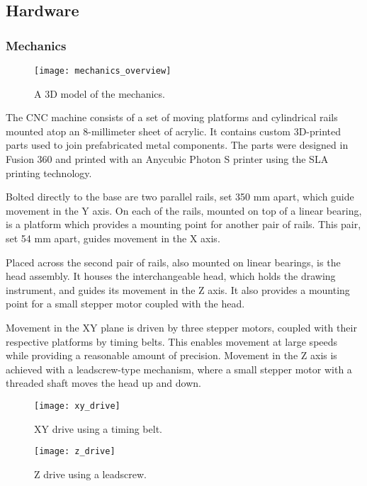 \clearpage
\subsection{Hardware}

\subsubsection{Mechanics}

\begin{figure}[ht]
    \begin{center}
        \texttt{[image: mechanics\_overview]}
        \caption{A 3D model of the mechanics.}
    \end{center}
\end{figure}

The CNC machine consists of a set of moving platforms and cylindrical rails
mounted atop an 8-millimeter sheet of acrylic. It contains custom 3D-printed
parts used to join prefabricated metal components. The parts were designed in
Fusion 360 and printed with an Anycubic Photon S printer using the SLA
printing technology.

Bolted directly to the base are two parallel rails, set 350 mm apart, which
guide movement in the Y axis. On each of the rails, mounted on top of a linear
bearing, is a platform which provides a mounting point for another pair of
rails. This pair, set 54 mm apart, guides movement in the X axis.

Placed across the second pair of rails, also mounted on linear bearings, is the
head assembly. It houses the interchangeable head, which holds the drawing
instrument, and guides its movement in the Z axis. It also provides a mounting
point for a small stepper motor coupled with the head.

Movement in the XY plane is driven by three stepper motors, coupled with their
respective platforms by timing belts. This enables movement at large speeds
while providing a reasonable amount of precision. Movement in the Z axis is
achieved with a leadscrew-type mechanism, where a small stepper motor with a
threaded shaft moves the head up and down.

\begin{figure}[ht]
    \centering
    \begin{minipage}{0.5\textwidth}
        \centering
        \texttt{[image: xy\_drive]}
        \caption{XY drive using a timing belt.}
    \end{minipage}\hfill
    \begin{minipage}{0.5\textwidth}
        \centering
        \texttt{[image: z\_drive]}
        \caption{Z drive using a leadscrew.}
    \end{minipage}
\end{figure}

